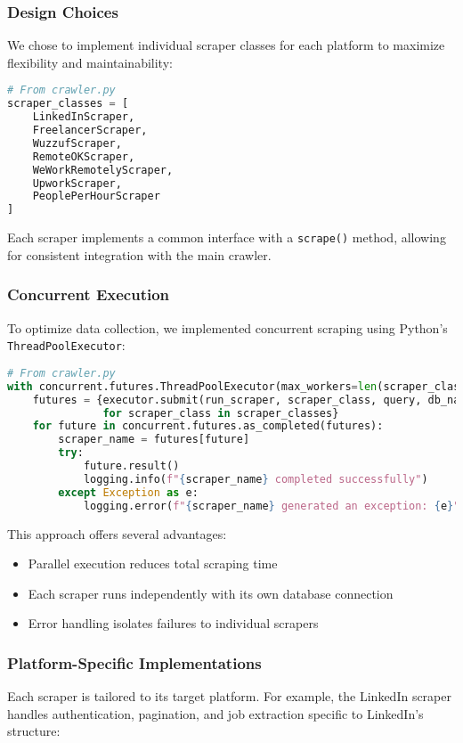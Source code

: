 \documentclass[12pt,a4paper]{article}
\begin{document}
\subsubsection{Design Choices}
We chose to implement individual scraper classes for each platform to maximize flexibility and maintainability:

\begin{lstlisting}[language=Python, caption=Scraper Class Structure]
# From crawler.py
scraper_classes = [
    LinkedInScraper,
    FreelancerScraper,
    WuzzufScraper,
    RemoteOKScraper,
    WeWorkRemotelyScraper,
    UpworkScraper,
    PeoplePerHourScraper
]
\end{lstlisting}

Each scraper implements a common interface with a \texttt{scrape()} method, allowing for consistent integration with the main crawler.

\subsubsection{Concurrent Execution}
To optimize data collection, we implemented concurrent scraping using Python's \texttt{ThreadPoolExecutor}:

\begin{lstlisting}[language=Python, caption=Concurrent Scraping Implementation]
# From crawler.py
with concurrent.futures.ThreadPoolExecutor(max_workers=len(scraper_classes)) as executor:
    futures = {executor.submit(run_scraper, scraper_class, query, db_name): scraper_class.__name__ 
               for scraper_class in scraper_classes}
    for future in concurrent.futures.as_completed(futures):
        scraper_name = futures[future]
        try:
            future.result()
            logging.info(f"{scraper_name} completed successfully")
        except Exception as e:
            logging.error(f"{scraper_name} generated an exception: {e}")
\end{lstlisting}

This approach offers several advantages:
\begin{itemize}
    \item Parallel execution reduces total scraping time
    \item Each scraper runs independently with its own database connection
    \item Error handling isolates failures to individual scrapers
\end{itemize}

\subsubsection{Platform-Specific Implementations}
Each scraper is tailored to its target platform. For example, the LinkedIn scraper handles authentication, pagination, and job extraction specific to LinkedIn's structure:
\end{document}
